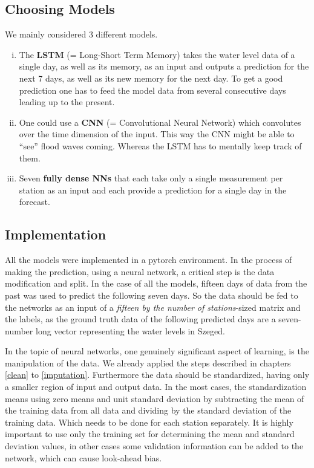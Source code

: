 \documentclass{article}
\newcommand{\tmem}[1]{{\em #1\/}}
\newcommand{\tmstrong}[1]{\textbf{#1}}
\newenvironment{enumerateroman}{\begin{enumerate}[i.] }{\end{enumerate}}
\begin{document}
\subsection{Choosing Models}

We mainly considered 3 different models.
\begin{enumerateroman}
  \item The {\tmstrong{LSTM}} (= Long-Short Term Memory) takes the water level
  data of a single day, as well as its memory, as an input and outputs a
  prediction for the next 7 days, as well as its new memory for the next day.
  To get a good prediction one has to feed the model data from several
  consecutive days leading up to the present.
  
  \item One could use a {\tmstrong{CNN}} (= Convolutional Neural Network)
  which convolutes over the time dimension of the input. This way the CNN
  might be able to ``see'' flood waves coming. Whereas the LSTM has to
  mentally keep track of them.
  
  \item Seven {\tmstrong{fully dense NNs}} that each take only a single
  measurement per station as an input and each provide a prediction for a
  single day in the forecast.
\end{enumerateroman}

\subsection{Implementation}

All the models were implemented in a pytorch environment. In the process of
making the prediction, using a neural network, a critical step is the data
modification and split. In the case of all the models, fifteen days of data
from the past was used to predict the following seven days. So the data should
be fed to the networks as an input of a {\tmem{fifteen by the number of
stations}}-sized matrix and the labels, as the ground truth data of the
following predicted days are a seven-number long vector representing the water
levels in Szeged.

In the topic of neural networks, one genuinely significant aspect of learning,
is the manipulation of the data. We already applied the steps described in
chapters \ref{clean} to \ref{imputation}. Furthermore the data should be
standardized, having only a smaller region of input and output data. In the
most cases, the standardization means using zero means and unit standard
deviation by subtracting the mean of the training data from all data and
dividing by the standard deviation of the training data. Which needs to be
done for each station separately. It is highly important to use only the
training set for determining the mean and standard deviation values, in other
cases some validation information can be added to the network, which can cause
look-ahead bias.
\end{document}
